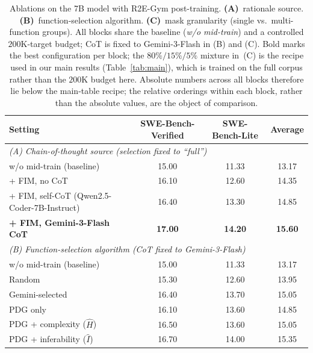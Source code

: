 \begin{table}[t]
\centering
\caption{Ablations on the 7B model with R2E-Gym post-training.
\textbf{(A)}~rationale source. \textbf{(B)}~function-selection
algorithm. \textbf{(C)}~mask granularity (single vs.\ multi-function
groups). All blocks share the baseline (\emph{w/o mid-train}) and a
controlled $200$K-target budget; CoT is fixed to Gemini-3-Flash in
(B) and (C). Bold marks the best configuration per block; the
$80\%/15\%/5\%$ mixture in~(C) is the recipe used in our main results
(Table~\ref{tab:main}), which is trained on the full corpus rather
than the $200$K budget here. Absolute numbers across all blocks
therefore lie below the main-table recipe; the relative orderings
within each block, rather than the absolute values, are the object
of comparison.}
\label{tab:ablation}
\small
\setlength{\tabcolsep}{8pt}
\begin{tabular}{lccc}
\toprule
Setting & SWE-Bench-Verified & SWE-Bench-Lite & Average \\
\midrule
\multicolumn{4}{l}{\emph{(A) Chain-of-thought source (selection fixed to ``full'')}} \\
\midrule
w/o mid-train (baseline)                  & 15.00 & 11.33 & 13.17 \\
+ FIM, no CoT                             & 16.10 & 12.60 & 14.35 \\
+ FIM, self-CoT (Qwen2.5-Coder-7B-Instruct) & 16.40 & 13.30 & 14.85 \\
\textbf{+ FIM, Gemini-3-Flash CoT}        & \textbf{17.00} & \textbf{14.20} & \textbf{15.60} \\
\midrule
\multicolumn{4}{l}{\emph{(B) Function-selection algorithm (CoT fixed to Gemini-3-Flash)}} \\
\midrule
w/o mid-train (baseline)                    & 15.00 & 11.33 & 13.17 \\
Random                                      & 15.30 & 12.60 & 13.95 \\
Gemini-selected                             & 16.40 & 13.70 & 15.05 \\
PDG only                                    & 16.10 & 13.60 & 14.85 \\
PDG + complexity ($\hat{H}$)                & 16.50 & 13.60 & 15.05 \\
PDG + inferability ($\hat{I}$)              & 16.70 & 14.00 & 15.35 \\

\end{tabular}
\end{table}

